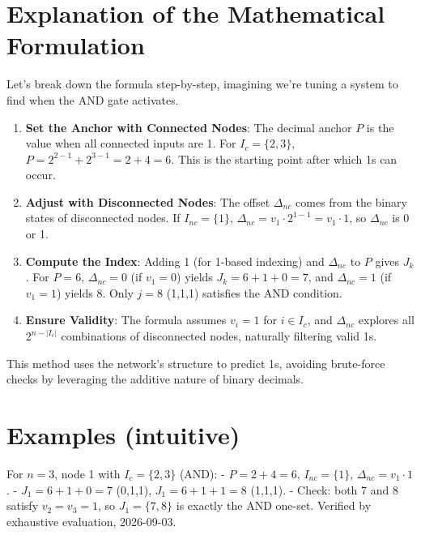 \documentclass[12pt]{article}
\begin{document}
\section{Explanation of the Mathematical Formulation}
Let’s break down the formula step-by-step, imagining we’re tuning a system to find when the AND gate activates.

\begin{enumerate}
    \item \textbf{Set the Anchor with Connected Nodes}: The decimal anchor \( P \) is the value when all connected inputs are 1. For \( I_c = \{2, 3\} \), \( P = 2^{2-1} + 2^{3-1} = 2 + 4 = 6 \). This is the starting point after which 1s can occur.
    
    \item \textbf{Adjust with Disconnected Nodes}: The offset \( \Delta_{nc} \) comes from the binary states of disconnected nodes. If \( I_{nc} = \{1\} \), \( \Delta_{nc} = v_1 \cdot 2^{1-1} = v_1 \cdot 1 \), so \( \Delta_{nc} \) is 0 or 1.
    
    \item \textbf{Compute the Index}: Adding 1 (for 1-based indexing) and \( \Delta_{nc} \) to \( P \) gives \( J_k \). For \( P = 6 \), \( \Delta_{nc} = 0 \) (if \( v_1 = 0 \)) yields \( J_k = 6 + 1 + 0 = 7 \), and \( \Delta_{nc} = 1 \) (if \( v_1 = 1 \)) yields \( 8 \). Only \( j = 8 \) (1,1,1) satisfies the AND condition.
    
    \item \textbf{Ensure Validity}: The formula assumes \( v_i = 1 \) for \( i \in I_c \), and \( \Delta_{nc} \) explores all \( 2^{n - |I_c|} \) combinations of disconnected nodes, naturally filtering valid 1s.
\end{enumerate}

This method uses the network’s structure to predict 1s, avoiding brute-force checks by leveraging the additive nature of binary decimals.

\section{Examples (intuitive)}
For \( n = 3 \), node 1 with \( I_c = \{2, 3\} \) (AND):
- \( P = 2 + 4 = 6 \), \( I_{nc} = \{1\} \), \( \Delta_{nc} = v_1 \cdot 1 \).
- \( J_1 = 6 + 1 + 0 = 7 \) (0,1,1), \( J_1 = 6 + 1 + 1 = 8 \) (1,1,1).
- Check: both 7 and 8 satisfy \( v_2 = v_3 = 1 \), so \( J_1 = \{7,8\} \) is exactly
  the AND one-set. Verified by exhaustive evaluation, 2026-09-03.
\end{document}
